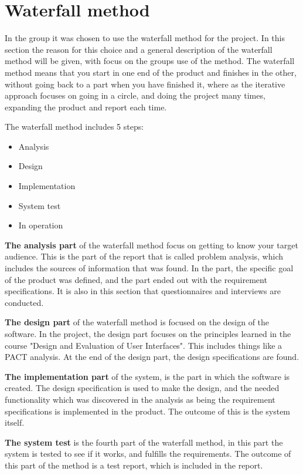 \section{Waterfall method}

In the group it was chosen to use the waterfall method for the project. In this section the reason for this choice and a general description of the waterfall method will be given, with focus on the groups use of the method. The waterfall method means that you start in one end of the product and finishes in the other, without going back to a part when you have finished it, where as the iterative approach focuses on going in a circle, and doing the project many times, expanding the product and report each time.

The waterfall method includes 5 steps:

\begin{itemize}
	\item Analysis
	\item Design
	\item Implementation
	\item System test
	\item In operation
\end{itemize}

\textbf{The analysis part} of the waterfall method focus on getting to know your target audience. This is the part of the report that is called problem analysis, which includes the sources of information that was found. In the part, the specific goal of the product was defined, and the part ended out with the requirement specifications. It is also in this section that questionnaires and interviews are conducted.

\textbf{The design part} of the waterfall method is focused on the design of the software. In the project, the design part focuses on the principles learned in the course "Design and Evaluation of User Interfaces". This includes things like a PACT analysis. At the end of the design part, the design specifications are found.

\textbf{The implementation part} of the system, is the part in which the software is created. The design specification is used to make the design, and the needed functionality which was discovered in the analysis as being the requirement specifications is implemented in the product. The outcome of this is the system itself.

\textbf{The system test} is the fourth part of the waterfall method, in this part the system is tested to see if it works, and fulfills the requirements. The outcome of this part of the method is a test report, which is included in the report.

